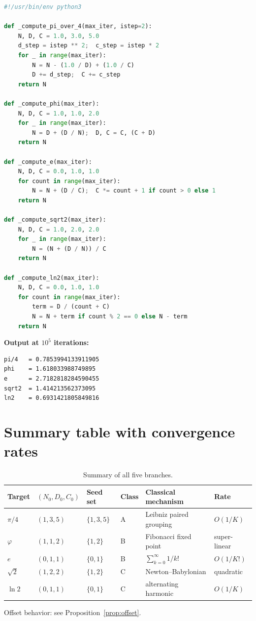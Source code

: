 \documentclass[12pt]{article}
\theoremstyle{definition}
\theoremstyle{remark}
\begin{document}
\begin{lstlisting}[language=Python,caption={Reference implementation.},label={lst:impl}]
#!/usr/bin/env python3

def _compute_pi_over_4(max_iter, istep=2):
    N, D, C = 1.0, 3.0, 5.0
    d_step = istep ** 2;  c_step = istep * 2
    for _ in range(max_iter):
        N = N - (1.0 / D) + (1.0 / C)
        D += d_step;  C += c_step
    return N

def _compute_phi(max_iter):
    N, D, C = 1.0, 1.0, 2.0
    for _ in range(max_iter):
        N = D + (D / N);  D, C = C, (C + D)
    return N

def _compute_e(max_iter):
    N, D, C = 0.0, 1.0, 1.0
    for count in range(max_iter):
        N = N + (D / C);  C *= count + 1 if count > 0 else 1
    return N

def _compute_sqrt2(max_iter):
    N, D, C = 1.0, 2.0, 2.0
    for _ in range(max_iter):
        N = (N + (D / N)) / C
    return N

def _compute_ln2(max_iter):
    N, D, C = 0.0, 1.0, 1.0
    for count in range(max_iter):
        term = D / (count + C)
        N = N + term if count % 2 == 0 else N - term
    return N

\end{lstlisting}

\textbf{Output at $10^5$ iterations:}
\begin{verbatim}
pi/4   = 0.7853994133911905
phi    = 1.618033988749895
e      = 2.7182818284590455
sqrt2  = 1.414213562373095
ln2    = 0.6931421805849816
\end{verbatim}

\section{Summary table with convergence rates}\label{app:summary}
\begin{table}[ht]
\centering\caption{Summary of all five branches.}\label{tab:summary}
\begin{tabular}{llllll}\toprule
Target & $(N_0,D_0,C_0)$ & Seed set & Class & Classical mechanism & Rate \\\midrule
$\pi/4$    & $(1,3,5)$ & $\{1,3,5\}$ & A & Leibniz paired grouping  & $O(1/K)$ \\
$\varphi$  & $(1,1,2)$ & $\{1,2\}$   & B & Fibonacci fixed point    & super-linear \\
$e$        & $(0,1,1)$ & $\{0,1\}$   & B & $\sum_{k=0}^\infty 1/k!$ & $O(1/K!)$ \\
$\sqrt{2}$ & $(1,2,2)$ & $\{1,2\}$   & C & Newton--Babylonian       & quadratic \\
$\ln 2$    & $(0,1,1)$ & $\{0,1\}$   & C & alternating harmonic     & $O(1/K)$ \\\bottomrule
\end{tabular}\end{table}
Offset behavior: see Proposition~\ref{prop:offset}.



\end{document}
